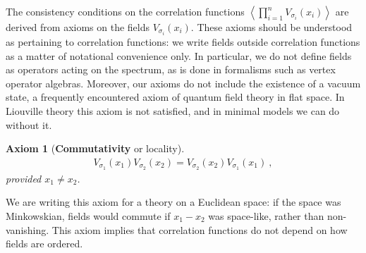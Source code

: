 \documentclass[12pt, a4paper, notitlepage, twoside]{report}
\numberwithin{equation}{section}
\theoremstyle{break}
\newtheorem{hyp}{Axiom}[chapter]
\begin{document}
The consistency conditions on the correlation functions $\left\langle\prod_{i=1}^n V_{\sigma_i}(x_i)\right\rangle$ are derived from axioms on the fields $V_{\sigma_i}(x_i)$. These axioms should be understood as pertaining to correlation functions: we write fields outside correlation functions as a matter of notational convenience only. In particular, we do not define fields as operators acting on the spectrum, as is done in formalisms such as vertex operator algebras. 
Moreover, our axioms do not include the existence of a vacuum state, a frequently encountered axiom of quantum field theory in flat space.
In Liouville theory this axiom is not satisfied, and in minimal models we can do without it. 

\begin{hyp}[\textbf{Commutativity} or locality]
\label{ax:col}
\begin{align}
 \boxed{V_{\sigma_1}(x_1)V_{\sigma_2}(x_2) = V_{\sigma_2}(x_2) V_{\sigma_1}(x_1)}\ ,
\label{comm}
\end{align}
provided $x_1\neq x_2$. 
\end{hyp}
\noindent
We are writing this axiom for a theory on a Euclidean space: if the space was Minkowskian, fields would commute if $x_1-x_2$ was space-like, rather than non-vanishing. 
This axiom implies that correlation functions do not depend on how fields are ordered.
\end{document}
